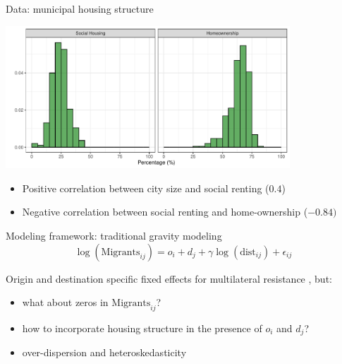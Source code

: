 \documentclass{beamer}
\begin{document}
\begin{frame}{Data: municipal housing structure}
\begin{center}
	\includegraphics[width=0.8\textwidth]{../fig/hist_housing}      
\end{center}
\begin{itemize}
	\item Positive correlation between city size and social renting ($0.4$)
	\item Negative correlation between social renting and home-ownership ($-0.84)$
\end{itemize}
\end{frame}

\begin{frame}{Modeling framework: traditional gravity modeling}
	\begin{equation*}
	\log(\text{Migrants}_{ij}) = o_i + d_j + \gamma\log(\text{dist}_{ij}) + \epsilon_{ij}
	\label{eq:gravfixed}
	\end{equation*} 
	
	Origin and destination specific \alert{fixed} effects for multilateral resistance  \citep{anderson2003gravity} , but:
	\begin{itemize}
		\item what about \alert{zeros} in $\text{Migrants}_{ij}$?
		\item how to incorporate \alert{housing} structure in the presence of $o_i$ and $d_j$?
		\item \alert{over-dispersion} and \alert{heteroskedasticity} \footnotesize{\citep{silva2006log} }
	\end{itemize}
\end{frame}
\end{document}
